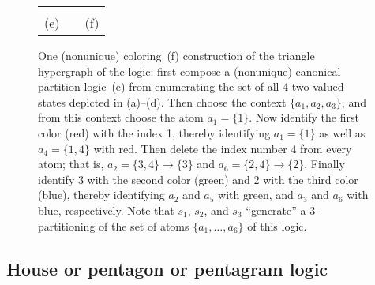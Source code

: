 \documentclass[%
12pt,
prereprint,
showpacs,
showkeys,
preprintnumbers,
amsmath,amssymb,
aps,
pra,
longbibliography,
notitlepage
]{revtex4-1}
\theoremstyle{definition}
\begin{document}
\begin{figure}
\begin{center}
\begin{tabular}{ c c c}
\begin{tikzpicture}  [scale=0.8]
                                \end{tikzpicture}
                                \\
                                (e)&&(f)
                        \end{tabular}
                \end{center}
                \caption{\label{2020-f-chroma-triangle3}
                        One (nonunique) coloring~(f) construction of
                        the triangle hypergraph of the logic: first compose a (nonunique)
                        canonical partition logic~(e) from enumerating the set of all 4 two-valued states depicted in (a)--(d).
                        Then choose the context $\{a_1,a_2,a_3\}$, and from this context choose the atom $a_1=\{1\}$.
                        Now identify the first color (red) with the index 1, thereby identifying $a_1=\{1\}$ as well as $a_4=\{1,4\}$ with red.
                        Then delete the index number $4$ from every atom; that is, $a_2=\{3,4\}\rightarrow \{3\}$ and $a_6=\{2,4\}\rightarrow \{2\}$.
                        Finally identify 3 with the second color (green) and 2 with the third color (blue),
                        thereby identifying $a_2$ and $a_5$ with green, and $a_3$ and $a_6$ with blue, respectively.
                        Note that $s_1$, $s_2$, and $s_3$ ``generate'' a 3-partitioning of the set of atoms $\{a_1,\ldots ,a_6\}$ of this logic.
                }
        \end{figure}

        \subsection{House or pentagon or pentagram logic}
\end{document}

